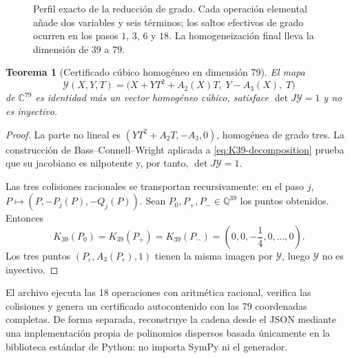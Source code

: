 \documentclass[11pt]{article}
\newtheorem{theorem}{Teorema}[section]
\theoremstyle{definition}
\theoremstyle{remark}
\newcommand{\C}{\mathbb{C}}
\newcommand{\Q}{\mathbb{Q}}
\begin{document}
\begin{figure}[htbp]
\caption{Perfil exacto de la reducci\'on de grado. Cada operaci\'on elemental
a\~nade dos variables y seis t\'erminos; los saltos efectivos de grado ocurren
en los pasos $1$, $3$, $6$ y $18$. La homogeneizaci\'on final lleva la
dimensi\'on de $39$ a $79$.}
\label{fig:bcw-profile}
\end{figure}

\begin{theorem}[Certificado c\'ubico homog\'eneo en dimensi\'on 79]
\label{thm:explicit-yagzhev}
El mapa
\begin{equation}\label{eq:explicit-yagzhev}
\mathcal Y(X,Y,T)=
\bigl(X+YT^2+A_2(X)T,\;Y-A_3(X),\;T\bigr)
\end{equation}
de $\C^{79}$ es identidad m\'as un vector homog\'eneo c\'ubico, satisface
$\det J\mathcal Y=1$ y no es inyectivo.
\end{theorem}

\begin{proof}
La parte no lineal es $(YT^2+A_2T,-A_3,0)$, homog\'enea de grado tres. La
construcci\'on de Bass--Connell--Wright aplicada a
\eqref{eq:K39-decomposition} prueba que su jacobiano es nilpotente y, por
tanto, $\det J\mathcal Y=1$.

Las tres colisiones racionales se transportan recursivamente: en el paso $j$,
$P\mapsto(P,-P_j(P),-Q_j(P))$. Sean $P_0,P_+,P_-\in\Q^{39}$ los puntos
obtenidos. Entonces
\[
K_{39}(P_0)=K_{39}(P_+)=K_{39}(P_-)
=\left(0,0,-\frac14,0,\ldots,0\right).
\]
Los tres puntos $(P_\varepsilon,A_3(P_\varepsilon),1)$ tienen la misma imagen
por $\mathcal Y$, luego $\mathcal Y$ no es inyectivo.
\end{proof}

El archivo  ejecuta las 18 operaciones
con aritm\'etica racional, verifica las colisiones y genera un certificado
autocontenido con las 79 coordenadas completas. De forma separada,
 reconstruye la cadena desde el
JSON mediante una implementaci\'on propia de polinomios dispersos basada
\'unicamente en la biblioteca est\'andar de Python: no importa SymPy ni el
generador.
\end{document}
